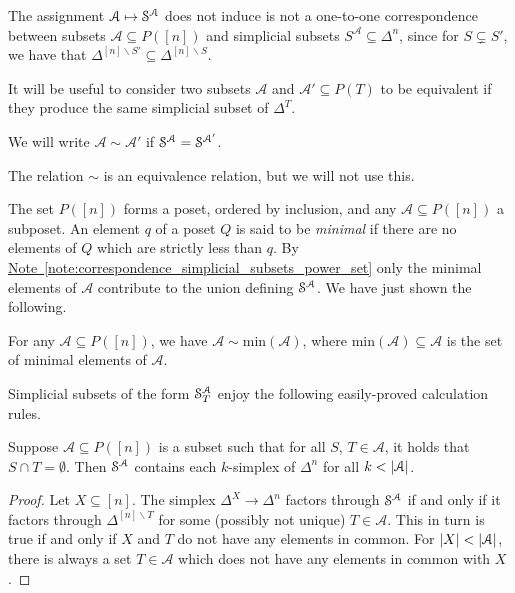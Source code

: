 \documentclass[main.tex]{subfiles}
\begin{document}
\begin{note}
  \label{note:correspondence_simplicial_subsets_power_set}
  The assignment $\mathcal{A} \mapsto \S^{\mathcal{A}}$ does not induce is not a one-to-one correspondence between subsets $\mathcal{A} \subseteq P([n])$ and simplicial subsets $S^{\mathcal{A}} \subseteq \Delta^{n}$, since for $S \subsetneq S'$, we have that $\Delta^{[n] \smallsetminus S'} \subseteq \Delta^{[n] \smallsetminus S}$.
\end{note}

It will be useful to consider two subsets $\mathcal{A}$ and $\mathcal{A}' \subseteq P(T)$ to be equivalent if they produce the same simplicial subset of $\Delta^{T}$.

\begin{definition}
  We will write $\mathcal{A} \sim \mathcal{A}'$ if $\S^{\mathcal{A}} = \S^{\mathcal{A}'}$.
\end{definition}

The relation $\sim$ is an equivalence relation, but we will not use this.

The set $P([n])$ forms a poset, ordered by inclusion, and any $\mathcal{A} \subseteq P([n])$ a subposet. An element $q$ of a poset $Q$ is said to be \emph{minimal} if there are no elements of $Q$ which are strictly less than $q$. By \hyperref[note:correspondence_simplicial_subsets_power_set]{Note~\ref*{note:correspondence_simplicial_subsets_power_set}} only the minimal elements of $\mathcal{A}$ contribute to the union defining $\S^{\mathcal{A}}$. We have just shown the following.

\begin{lemma}
  \label{lemma:replace_poset_by_minimal_elements}
  For any $\mathcal{A} \subseteq P([n])$, we have $\mathcal{A} \sim \mathrm{min}(\mathcal{A})$, where $\mathrm{min}(\mathcal{A}) \subseteq \mathcal{A}$ is the set of minimal elements of $\mathcal{A}$.
\end{lemma}

Simplicial subsets of the form $\S^{\mathcal{A}}_{T}$ enjoy the following easily-proved calculation rules.

\begin{lemma}
  \label{lemma:subset_of_simplex_contains_k_simplices}
  Suppose $\mathcal{A} \subseteq P([n])$ is a subset such that for all $S$, $T \in \mathcal{A}$, it holds that $S \cap T = \emptyset$. Then $\S^{\mathcal{A}}$ contains each $k$-simplex of $\Delta^{n}$ for all $k < \abs{\mathcal{A}}$.
\end{lemma}
\begin{proof}
  Let $X \subseteq [n]$. The simplex $\Delta^{X} \to \Delta^{n}$ factors through $\S^{\mathcal{A}}$ if and only if it factors through $\Delta^{[n] \smallsetminus T}$ for some (possibly not unique) $T \in \mathcal{A}$. This in turn is true if and only if $X$ and $T$ do not have any elements in common. For $\abs{X} < \abs{\mathcal{A}}$, there is always a set $T \in \mathcal{A}$ which does not have any elements in common with $X$.
\end{proof}
\end{document}
